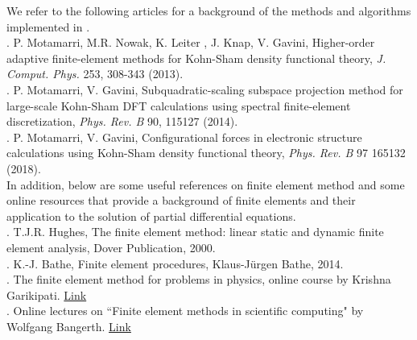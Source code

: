 We refer to the following articles for a background of the methods and algorithms implemented in \dftfe. \\

. P. Motamarri, M.R. Nowak, K. Leiter , J. Knap, V. Gavini, Higher-order adaptive finite-element methods for Kohn-Sham density functional theory, \emph{J. Comput. Phys.} 253, 308-343 (2013).\\
 
 . P. Motamarri, V. Gavini, Subquadratic-scaling subspace projection method for large-scale Kohn-Sham DFT calculations using spectral finite-element discretization, \emph{Phys. Rev. B} 90, 115127 (2014).\\

. P. Motamarri, V. Gavini,  Configurational forces in electronic structure calculations using Kohn-Sham density functional theory, \emph{Phys. Rev. B} 97 165132 (2018).\\

\noindent In addition, below are some useful references on finite element method and some online resources that provide a background of finite elements and their application to the solution of partial differential equations.\\

. T.J.R. Hughes, The finite element method: linear static and dynamic finite element analysis, Dover Publication, 2000.\\

. K.-J. Bathe, Finite element procedures, Klaus-J\"{u}rgen Bathe, 2014.\\

. The finite element method for problems in physics, online course by Krishna Garikipati. \href{https://www.coursera.org/learn/finite-element-method}{Link}\\

. Online lectures on ``Finite element methods in scientific computing" by Wolfgang Bangerth. \href{http://www.math.colostate.edu/~bangerth/videos.html}{Link}\\ 

